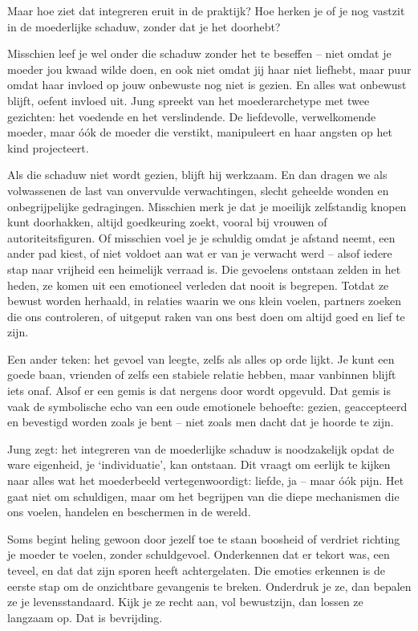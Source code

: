 Maar hoe ziet dat integreren eruit in de praktijk? Hoe herken je of je nog vastzit in de moederlijke schaduw, zonder dat je het doorhebt?

Misschien leef je wel onder die schaduw zonder het te beseffen – niet omdat je moeder jou kwaad wilde doen, en ook niet omdat jij haar niet liefhebt, maar puur omdat haar invloed op jouw onbewuste nog niet is gezien. En alles wat onbewust blijft, oefent invloed uit. Jung spreekt van het moederarchetype met twee gezichten: het voedende en het verslindende. De liefdevolle, verwelkomende moeder, maar óók de moeder die verstikt, manipuleert en haar angsten op het kind projecteert.

Als die schaduw niet wordt gezien, blijft hij werkzaam. En dan dragen we als volwassenen de last van onvervulde verwachtingen, slecht geheelde wonden en onbegrijpelijke gedragingen. Misschien merk je dat je moeilijk zelfstandig knopen kunt doorhakken, altijd goedkeuring zoekt, vooral bij vrouwen of autoriteitsfiguren. Of misschien voel je je schuldig omdat je afstand neemt, een ander pad kiest, of niet voldoet aan wat er van je verwacht werd – alsof iedere stap naar vrijheid een heimelijk verraad is. Die gevoelens ontstaan zelden in het heden, ze komen uit een emotioneel verleden dat nooit is begrepen. Totdat ze bewust worden herhaald, in relaties waarin we ons klein voelen, partners zoeken die ons controleren, of uitgeput raken van ons best doen om altijd goed en lief te zijn.

Een ander teken: het gevoel van leegte, zelfs als alles op orde lijkt. Je kunt een goede baan, vrienden of zelfs een stabiele relatie hebben, maar vanbinnen blijft iets onaf. Alsof er een gemis is dat nergens door wordt opgevuld. Dat gemis is vaak de symbolische echo van een oude emotionele behoefte: gezien, geaccepteerd en bevestigd worden zoals je bent – niet zoals men dacht dat je hoorde te zijn.

Jung zegt: het integreren van de moederlijke schaduw is noodzakelijk opdat de ware eigenheid, je ‘individuatie’, kan ontstaan. Dit vraagt om eerlijk te kijken naar alles wat het moederbeeld vertegenwoordigt: liefde, ja – maar óók pijn. Het gaat niet om schuldigen, maar om het begrijpen van die diepe mechanismen die ons voelen, handelen en beschermen in de wereld.

Soms begint heling gewoon door jezelf toe te staan boosheid of verdriet richting je moeder te voelen, zonder schuldgevoel. Onderkennen dat er tekort was, een teveel, en dat dat zijn sporen heeft achtergelaten. Die emoties erkennen is de eerste stap om de onzichtbare gevangenis te breken. Onderdruk je ze, dan bepalen ze je levensstandaard. Kijk je ze recht aan, vol bewustzijn, dan lossen ze langzaam op. Dat is bevrijding.


